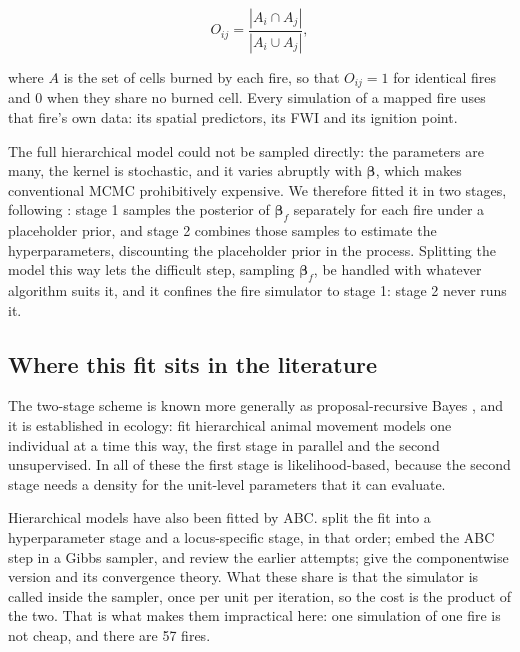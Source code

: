 \documentclass[11pt,a4paper]{article}
\begin{document}
\begin{equation}
\label{eq:overlap}
O_{ij} = \frac{|A_i \cap A_j|}{|A_i \cup A_j|},
\end{equation}

\noindent where $A$ is the set of cells burned by each fire, so that $O_{ij} = 1$ for
identical fires and 0 when they share no burned cell. Every simulation of a mapped fire
uses that fire's own data: its spatial predictors, its FWI and its ignition point.

The full hierarchical model could not be sampled directly: the parameters are many, the
kernel is stochastic, and it varies abruptly with $\boldsymbol{\beta}$, which makes
conventional MCMC prohibitively expensive. We therefore fitted it in two stages, following
\citet{lunn2013fully}: stage 1 samples the posterior of $\boldsymbol{\beta}_f$ separately
for each fire under a placeholder prior, and stage 2 combines those samples to estimate
the hyperparameters, discounting the placeholder prior in the process. Splitting the model
this way lets the difficult step, sampling $\boldsymbol{\beta}_f$, be handled with
whatever algorithm suits it, and it confines the fire simulator to stage 1: stage 2 never
runs it.

\subsection{Where this fit sits in the literature}

The two-stage scheme is known more generally as proposal-recursive Bayes
\citep{hooten2021making}, and it is established in ecology: \citet{hooten2016hierarchical}
fit hierarchical animal movement models one individual at a time this way, the first stage in
parallel and the second unsupervised. In all of these the first stage is likelihood-based,
because the second stage needs a density for the unit-level parameters that it can evaluate.

Hierarchical models have also been fitted by ABC. \citet{bazin2010likelihood} split the fit
into a hyperparameter stage and a locus-specific stage, in that order;
\citet{turner2014hierarchical} embed the ABC step in a Gibbs sampler, and review the earlier
attempts; \citet{clarte2021componentwise} give the componentwise version and its convergence
theory. What these share is that the simulator is called inside the sampler, once per unit per
iteration, so the cost is the product of the two. That is what makes them impractical here:
one simulation of one fire is not cheap, and there are 57 fires.
\end{document}
